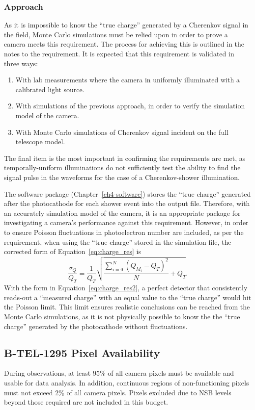 \subsubsection{Approach}
As it is impossible to know the ``true charge'' generated by a Cherenkov signal in the field, Monte Carlo simulations must be relied upon in order to prove a camera meets this requirement. The process for achieving this is outlined in the notes to the requirement. It is expected that this requirement is validated in three ways:
\begin{enumerate}
\item With lab measurements where the camera in uniformly illuminated with a calibrated light source.
\item With simulations of the previous approach, in order to verify the simulation model of the camera.
\item With Monte Carlo simulations of Cherenkov signal incident on the full telescope model.
\end{enumerate}
The final item is the most important in confirming the requirements are met, as temporally-uniform illuminations do not sufficiently test the ability to find the signal pulse in the waveforms for the case of a Cherenkov-shower illumination. 

The software package  (Chapter~\ref{ch4-software}) stores the ``true charge'' generated after the photocathode for each shower event into the output file. Therefore, with an accurately simulation model of the camera, it is an appropriate package for investigating a camera's performance against this requirement. However, in order to ensure Poisson fluctuations in photoelectron number are included, as per the requirement, when using the ``true charge'' stored in the simulation file, the corrected form of Equation~\ref{eq:charge_res} is
\begin{equation} \label{eq:charge_res2}
\dfrac{\sigma_Q}{Q_T} = \dfrac{1}{Q_T} \sqrt{\dfrac{\sum_{i=0}^N (Q_{M_i} - Q_T)^2}{N} + Q_T}.
\end{equation}
With the form in Equation~\ref{eq:charge_res2}, a perfect detector that consistently reads-out a ``measured charge'' with an equal value to the ``true charge'' would hit the Poisson limit. This limit ensures realistic conclusions can be reached from the Monte Carlo simulations, as it is not physically possible to know the the ``true charge'' generated by the photocathode without fluctuations.
\newline
\begin{requirement}{\subsection{B-TEL-1295 Pixel Availability}}
During observations, at least 95\% of all camera pixels must be available and usable for data analysis. In addition, continuous regions of non-functioning pixels must not exceed 2\% of all camera pixels. Pixels excluded due to NSB levels beyond those required are not included in this budget.
\end{requirement}

